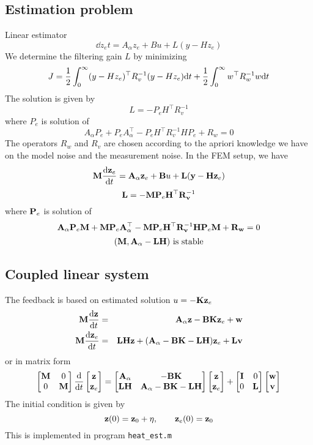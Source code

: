 \documentclass[12pt]{article}
\begin{document}

\subsection{Estimation problem}
Linear estimator
\[
\dd{z_e}{t} = A_\alpha z_e + B u + L(y - H z_e)
\]
We determine the filtering gain $L$ by minimizing
\[
J = \frac{1}{2} \int_0^\infty (y - H z_e)^\top R^{-1}_v (y - H z_e) \textrm{d} t +    \frac{1}{2} \int_0^\infty w^\top R_w^{-1} w \textrm{d} t
\]
The solution is given by
\[
L = - P_e H^\top R^{-1}_v
\]
where $P_e$ is solution of
\[
A_\alpha P_e + P_e A_\alpha^\top - P_e H^\top R_v^{-1}  H P_e + R_w = 0
\]
The operators $R_w$ and $R_v$ are chosen according to the apriori knowledge we have on the model noise and the measurement noise. In the FEM setup, we have
\[
{\mathbf M} \frac{\textrm{d} {\mathbf z}_e}{\textrm{d} t} = {\mathbf A}_\alpha {\mathbf z}_e + {\mathbf B} u + {\mathbf L}({\mathbf y} - {\mathbf H} {\mathbf z}_e)
\]
\[
{\mathbf L} = - {\mathbf M} {\mathbf P}_e {\mathbf H}^\top {\mathbf R}^{-1}_{\mathbf v}
\]
where ${\mathbf P}_e$ is solution of
\[
{\mathbf A}_\alpha {\mathbf P}_e {\mathbf M} + {\mathbf M} {\mathbf P}_e {\mathbf A}_\alpha^\top - {\mathbf M} {\mathbf P}_e {\mathbf H}^\top {\mathbf R}_{\mathbf v}^{-1}  {\mathbf H} {\mathbf P}_e {\mathbf M} + {\mathbf R}_{\mathbf w} = 0
\]
\[
 ({\mathbf M},{\mathbf A}_\alpha - {\mathbf L} {\mathbf H}) \text{ is stable} 
\]


\subsection{Coupled linear system}
The feedback is based on estimated solution $u = -{\mathbf K} {\mathbf z}_e$
\begin{eqnarray*}
{\mathbf M} \frac{\textrm{d} {\mathbf z}}{\textrm{d} t} &=& {\mathbf A}_\alpha {\mathbf z} - {\mathbf B} {\mathbf K} {\mathbf z}_e + {\mathbf w} \\
{\mathbf M} \frac{\textrm{d} {\mathbf z}_e}{\textrm{d} t} &=& {\mathbf L} {\mathbf H} {\mathbf z} + ({\mathbf A}_\alpha - {\mathbf B} {\mathbf K} - {\mathbf L} {\mathbf H}) {\mathbf z}_e + {\mathbf L} {\mathbf v}
\end{eqnarray*}
or in matrix form
\[\begin{bmatrix}
   {\mathbf M} & 0\\
   0 & {\mathbf M} \\
  \end{bmatrix}
\frac{\textrm{d} }{\textrm{d} t} \begin{bmatrix}
{\mathbf z} \\
{\mathbf z}_e \end{bmatrix} = \begin{bmatrix}
{\mathbf A}_\alpha & -{\mathbf B} {\mathbf K} \\
{\mathbf L} {\mathbf H} & {\mathbf A}_\alpha - {\mathbf B} {\mathbf K} - {\mathbf L} {\mathbf H} \end{bmatrix} \begin{bmatrix}
{\mathbf z} \\ {\mathbf z}_e \end{bmatrix} + \begin{bmatrix}
{\mathbf I} & 0 \\
0 & {\mathbf L} \end{bmatrix} \begin{bmatrix}
{\mathbf w} \\ {\mathbf v} \end{bmatrix}
\]
The initial condition is given by
\[
{\mathbf z}(0) = {\mathbf z}_0 + \eta, \qquad {\mathbf z}_e(0) = {\mathbf z}_0
\]
This is implemented in program {\tt heat\_est.m}
\end{document}
